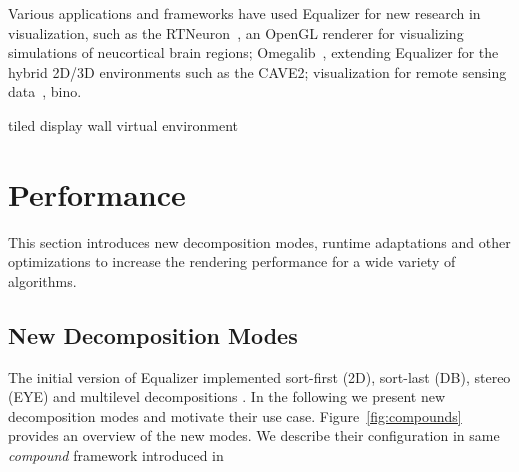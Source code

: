 \documentclass[10pt,journal,compsoc]{IEEEtran}
\newcommand{\fig}[1]{Figure~\ref{#1}}
\begin{document}
Various applications and frameworks have used Equalizer for new research in
visualization, such as the RTNeuron~\cite{HBBES:13}, an OpenGL renderer for
visualizing simulations of neucortical brain regions; Omegalib~\cite{Omegalib},
extending Equalizer for the hybrid 2D/3D environments such as the CAVE2;
visualization for remote sensing data~\cite{LK:09}, bino.

\cite{CKP:12} tiled display wall virtual environment


\section{Performance}

This section introduces new decomposition modes, runtime adaptations and other
optimizations to increase the rendering performance for a wide variety of
algorithms.

\subsection{New Decomposition Modes}

The initial version of Equalizer implemented sort-first (2D), sort-last (DB),
stereo (EYE) and multilevel decompositions \cite{EMP:09}. In the following we
present new decomposition modes and motivate their use case. \fig{fig:compounds}
provides an overview of the new modes. We describe their configuration in
same \textit{compound} framework introduced in \cite{EMP:09}
\end{document}
